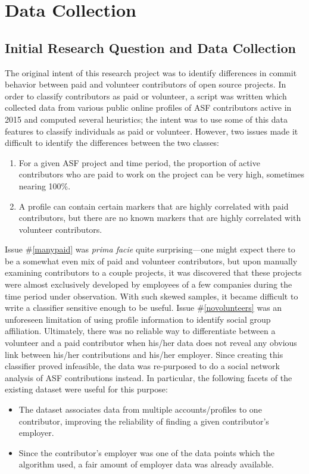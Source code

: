 \chapter{Data Collection}

\section{Initial Research Question and Data Collection}

The original intent of this research project was to identify differences in commit behavior between paid and volunteer contributors of open source projects. In order to classify contributors as paid or volunteer, a script was written which collected data from various public online profiles of ASF contributors active in 2015 and computed several heuristics;  the intent was to use some of this data features 
to classify individuals as paid or volunteer. 
 However, two issues made it difficult to identify the differences between the two classes:
\begin{enumerate}
	\item \label{manypaid} For a given ASF project and time period, the proportion of active contributors who are paid to work on the project can be very high, sometimes nearing 100\%.
	\item \label{novolunteers} A profile can contain certain markers that are highly correlated with paid contributors, but there are no known markers that are highly correlated with volunteer contributors.
\end{enumerate}
Issue \#\ref{manypaid} was \emph{prima facie} quite surprising---one might expect there to be a somewhat even mix of paid and volunteer contributors, but upon manually examining contributors to a couple projects, it was discovered that these projects were almost exclusively developed by employees of a few companies during the time period under observation. With such skewed samples, it became difficult to write a classifier sensitive enough to be useful.
Issue \#\ref{novolunteers} was an unforeseen limitation of using profile information to identify social group affiliation. Ultimately, there was no reliable way to differentiate between a volunteer and a paid contributor when his/her data does not reveal any obvious link between his/her contributions and his/her employer.
Since creating this classifier proved infeasible, the data was re-purposed to do a social network analysis of ASF contributions instead. In particular, the following facets of the existing dataset were useful for this purpose:
\begin{itemize}
	\item The dataset associates data from multiple accounts/profiles to one contributor, improving the reliability of finding a given contributor's employer.
	\item Since the contributor's employer was one of the data points which the algorithm used, a fair amount of employer data was already available.
\end{itemize}

